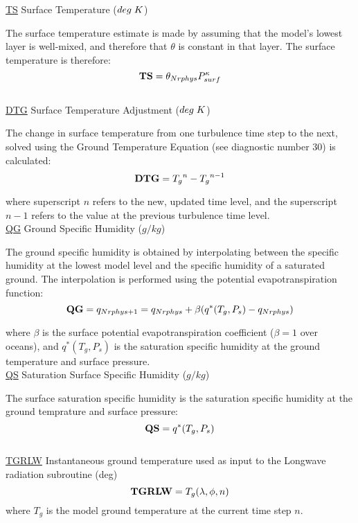 \noindent
{ \underline {TS}  Surface Temperature ($deg \hspace{.1cm} K$) }

\noindent
The surface temperature estimate is made by assuming that the model's lowest
layer is well-mixed, and therefore that $\theta$ is constant in that layer.
The surface temperature is therefore:
\[
{\bf TS} = \theta_{Nrphys} P^{\kappa}_{surf}
\]
\\
 
\noindent
{ \underline {DTG}  Surface Temperature Adjustment ($deg \hspace{.1cm} K$) }

\noindent
The change in surface temperature from one turbulence time step to the next, solved
using the Ground Temperature Equation (see diagnostic number 30) is calculated:
\[
{\bf DTG} = {T_g}^{n} - {T_g}^{n-1}
\]

\noindent
where superscript $n$ refers to the new, updated time level, and the superscript $n-1$
refers to the value at the previous turbulence time level.
\\
 
\noindent
{ \underline {QG}  Ground Specific Humidity ($g/kg$) }

\noindent
The ground specific humidity is obtained by interpolating between the specific
humidity at the lowest model level and the specific humidity of a saturated ground.
The interpolation is performed using the potential evapotranspiration function:
\[
{\bf QG} = q_{Nrphys+1} = q_{Nrphys} + \beta(q^*(T_g,P_s) - q_{Nrphys})
\]

\noindent
where $\beta$ is the surface potential evapotranspiration coefficient ($\beta=1$ over oceans), 
and $q^*(T_g,P_s)$ is the saturation specific humidity at the ground temperature and surface
pressure.
\\
 
\noindent
{ \underline {QS}  Saturation Surface Specific Humidity ($g/kg$) }

\noindent
The surface saturation specific humidity is the saturation specific humidity at
the ground temprature and surface pressure:
\[
{\bf QS} = q^*(T_g,P_s)
\]
\\
 
\noindent
{ \underline {TGRLW} Instantaneous ground temperature used as input to the Longwave
 radiation subroutine (deg)}
\[
{\bf TGRLW}  = T_g(\lambda , \phi ,n)
\]
\noindent
where $T_g$ is the model ground temperature at the current time step $n$.
\\
 
